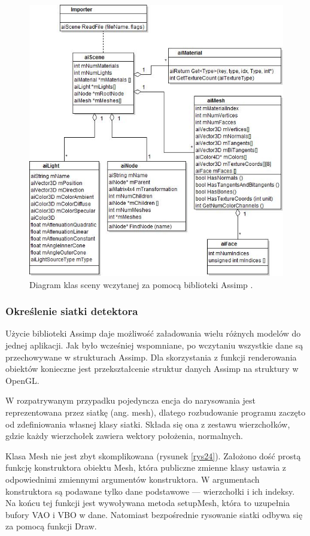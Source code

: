 \begin{figure}[H]
		\centering
 		\includegraphics[width=13.0cm]{assimpClasses.png}
    	\caption{Diagram klas sceny wczytanej za pomocą biblioteki Assimp \cite{assimpImport}.}
 		\label{rys14}
\end{figure}

\subsubsection{Określenie siatki detektora}
Użycie biblioteki Assimp daje możliwość załadowania wielu różnych modelów do jednej aplikacji. Jak było wcześniej wspomniane, po wczytaniu wszystkie dane są przechowywane w strukturach Assimp. Dla skorzystania z funkcji renderowania obiektów konieczne jest przekształcenie struktur danych Assimp na struktury w OpenGL.

W rozpatrywanym przypadku pojedyncza encja do narysowania jest reprezentowana przez siatkę (ang. mesh), dlatego rozbudowanie programu zaczęto od zdefiniowania własnej klasy siatki. Składa się ona z zestawu wierzchołków, gdzie każdy wierzchołek zawiera wektory położenia, normalnych.

Klasa Mesh nie jest zbyt skomplikowana (rysunek \ref{rys24}). Założono dość prostą funkcję konstruktora obiektu Mesh, która publiczne zmienne klasy ustawia z odpowiednimi zmiennymi argumentów konstruktora. W argumentach konstruktora są podawane tylko dane podstawowe --- wierzchołki i ich indeksy. Na końcu tej funkcji jest wywoływana metoda setupMesh, która to uzupełnia bufory VAO i VBO w dane. Natomiast bezpośrednie rysowanie siatki odbywa się za pomocą funkcji Draw.

